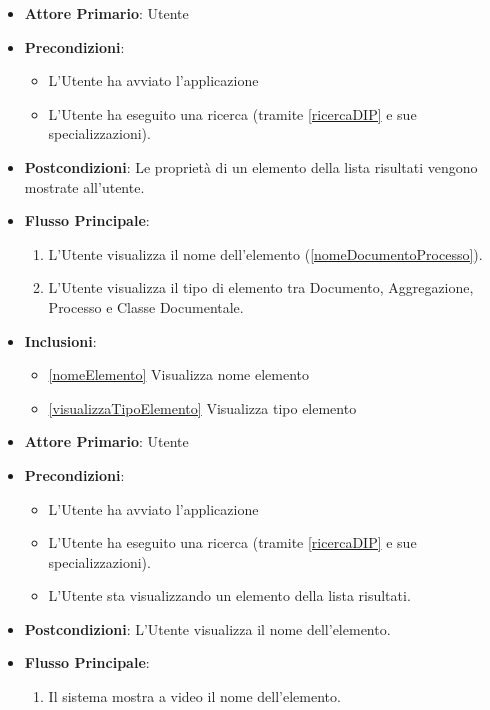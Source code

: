 \begin{itemize}
      \item \textbf{Attore Primario}: Utente
      \item \textbf{Precondizioni}: 
      \begin{itemize}
            \item L'Utente ha avviato l'applicazione
            \item L'Utente ha eseguito una ricerca (tramite \ref{ricercaDIP} e sue specializzazioni).
      \end{itemize}
      \item \textbf{Postcondizioni}: Le proprietà di un elemento della lista risultati vengono mostrate all'utente.
      \item \textbf{Flusso Principale}:
      \begin{enumerate}
            \item L'Utente visualizza il nome dell'elemento (\ref{nomeDocumentoProcesso}).
            \item L'Utente visualizza il tipo di elemento tra Documento, Aggregazione, Processo e Classe Documentale.
      \end{enumerate}
      \item \textbf{Inclusioni}:
      \begin{itemize}
            \item \ref{nomeElemento} Visualizza nome elemento
            \item \ref{visualizzaTipoElemento} Visualizza tipo elemento
      \end{itemize}
\end{itemize}

\begin{itemize}
      \item \textbf{Attore Primario}: Utente
      \item \textbf{Precondizioni}: 
      \begin{itemize}            \item L'Utente ha avviato l'applicazione
            \item L'Utente ha eseguito una ricerca (tramite \ref{ricercaDIP} e sue specializzazioni).
            \item L'Utente sta visualizzando un elemento della lista risultati.
      \end{itemize}
      \item \textbf{Postcondizioni}: L'Utente visualizza il nome dell'elemento.
      \item \textbf{Flusso Principale}:
      \begin{enumerate}
            \item Il sistema mostra a video il nome dell'elemento.
      \end{enumerate}
\end{itemize}

